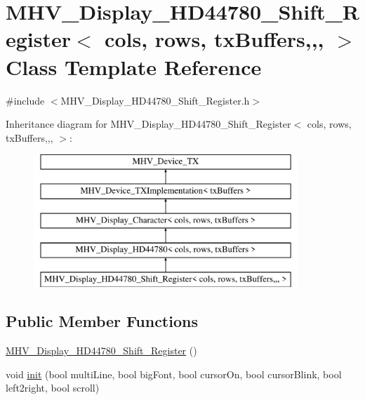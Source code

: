 \hypertarget{class_m_h_v___display___h_d44780___shift___register}{\section{M\-H\-V\-\_\-\-Display\-\_\-\-H\-D44780\-\_\-\-Shift\-\_\-\-Register$<$ cols, rows, tx\-Buffers,,, $>$ Class Template Reference}
\label{class_m_h_v___display___h_d44780___shift___register}
}


{\ttfamily \#include $<$M\-H\-V\-\_\-\-Display\-\_\-\-H\-D44780\-\_\-\-Shift\-\_\-\-Register.\-h$>$}

Inheritance diagram for M\-H\-V\-\_\-\-Display\-\_\-\-H\-D44780\-\_\-\-Shift\-\_\-\-Register$<$ cols, rows, tx\-Buffers,,, $>$\-:\begin{figure}[H]
\begin{center}
\leavevmode
\includegraphics[height=5.000000cm]{class_m_h_v___display___h_d44780___shift___register}
\end{center}
\end{figure}
\subsection*{Public Member Functions}
\begin{DoxyCompactItemize}
\item 
\hyperlink{class_m_h_v___display___h_d44780___shift___register_a60a8bf417fe274d2bdaa05bfa08f2208}{M\-H\-V\-\_\-\-Display\-\_\-\-H\-D44780\-\_\-\-Shift\-\_\-\-Register} ()
\item 
void \hyperlink{class_m_h_v___display___h_d44780___shift___register_a1fc08d5de2574a947d926ae7e0c331f6}{init} (bool multi\-Line, bool big\-Font, bool cursor\-On, bool cursor\-Blink, bool left2right, bool scroll)
\end{DoxyCompactItemize}

